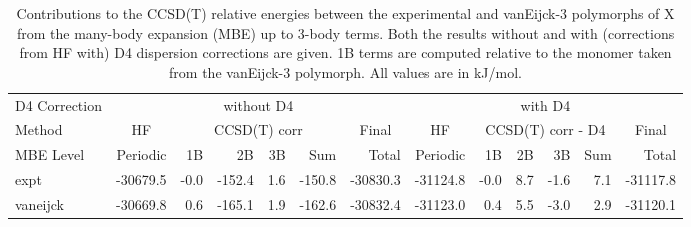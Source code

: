 \begin{table}[h]

\caption{\label{tab:x_mbe_contributions}Contributions to the CCSD(T) relative energies between the experimental and vanEijck-3 polymorphs of X from the many-body expansion (MBE) up to 3-body terms. Both the results without and with (corrections from HF with) D4 dispersion corrections are given. 1B terms are computed relative to the monomer taken from the vanEijck-3 polymorph. All values are in kJ/mol.}
\begin{tabular}{lrrrrrrrrrrrr}
\toprule
D4 Correction & \multicolumn{6}{c}{without D4} & \multicolumn{6}{c}{with D4} \\ \cmidrule(lr){2-7} \cmidrule(lr){8-13} 
Method & \multicolumn{1}{c}{HF} & \multicolumn{4}{c}{CCSD(T) corr} & \multicolumn{1}{c}{Final} & \multicolumn{1}{c}{HF} & \multicolumn{4}{c}{CCSD(T) corr - D4} & \multicolumn{1}{c}{Final} \\ \cmidrule(lr){2-2} \cmidrule(lr){3-6} \cmidrule(lr){7-7} \cmidrule(lr){8-8} \cmidrule(lr){9-12} \cmidrule(lr){13-13}
MBE Level & Periodic & 1B & 2B & 3B & Sum & Total & Periodic & 1B & 2B & 3B & Sum & Total \\
\midrule
expt & -30679.5 & -0.0 & -152.4 & 1.6 & -150.8 & -30830.3 & -31124.8 & -0.0 & 8.7 & -1.6 & 7.1 & -31117.8 \\
vaneijck & -30669.8 & 0.6 & -165.1 & 1.9 & -162.6 & -30832.4 & -31123.0 & 0.4 & 5.5 & -3.0 & 2.9 & -31120.1 \\
\bottomrule
\end{tabular}

\end{table}